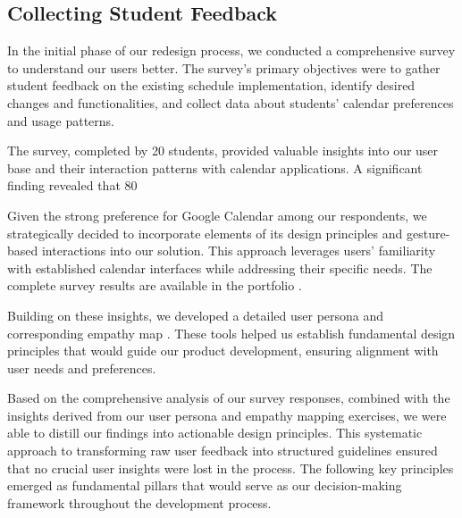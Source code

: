 \documentclass[sigconf,nonacm]{acmart}
\begin{document}
\subsection{Collecting Student Feedback}
In the initial phase of our redesign process, we conducted a comprehensive survey \cite{anketa1} to understand our users better. The survey's primary objectives were to gather student feedback on the existing schedule implementation, identify desired changes and functionalities, and collect data about students' calendar preferences and usage patterns.

The survey, completed by 20 students, provided valuable insights into our user base and their interaction patterns with calendar applications. A significant finding revealed that 80%

Given the strong preference for Google Calendar among our respondents, we strategically decided to incorporate elements of its design principles and gesture-based interactions into our solution. This approach leverages users' familiarity with established calendar interfaces while addressing their specific needs. The complete survey results are available in the portfolio \cite{anketa1-rez}.

Building on these insights, we developed a detailed user persona \cite{userpersona} and corresponding empathy map \cite{empathymap}. These tools helped us establish fundamental design principles \cite{principi} that would guide our product development, ensuring alignment with user needs and preferences.

Based on the comprehensive analysis of our survey responses, combined with the insights derived from our user persona and empathy mapping exercises, we were able to distill our findings into actionable design principles. This systematic approach to transforming raw user feedback into structured guidelines ensured that no crucial user insights were lost in the process. The following key principles emerged as fundamental pillars that would serve as our decision-making framework throughout the development process.
\end{document}
